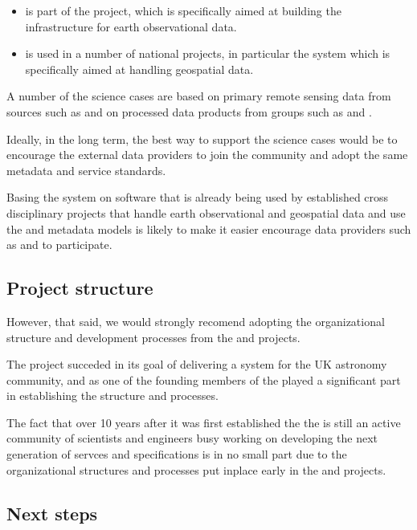 \documentclass{article}
\begin{document}
\begin{itemize}
    \item \cite{metacat} is part of the \cite{data-one} project, which is
    specifically aimed at building the infrastructure for earth observational
    data.
    \item \cite{ckan} is used in a number of national \cite{data-gov}
    projects, in particular the \cite{fgdc} \cite{fgdc-geo} system which
    is specifically aimed at handling geospatial data.
\end{itemize}

A number of the \cite{trop} science cases are based on primary remote
sensing data from sources such as \cite{landsat} and on processed data
products from groups such as \cite{nasa-jpl-carbon} and \cite{whrc}.

Ideally, in the long term, the best way to support the \cite{trop}
science cases would be to encourage the external data providers to join
the \cite{trop} community and adopt the same metadata and service standards.
 
Basing the \cite{trop} system on software that is already being used by
established cross disciplinary projects that handle earth observational
and geospatial data and use the \cite{gis} and \cite{eml} metadata
models is likely to make it easier encourage data providers such as
\cite{nasa-jpl-carbon} and \cite{whrc} to participate.

\subsection{Project structure}

However, that said, we would strongly recomend adopting the organizational
structure and development processes from the \cite{ivoa} and \cite{astro}
projects.


The \cite{astro} project succeded in its goal of delivering a \cite{vo}
system for the UK astronomy community, and as one of the founding members
of the \cite{ivoa} played a significant part in establishing the \cite{ivoa}
structure and processes.

The fact that over 10 years after it was first established the the \cite{ivoa}
is still an active community of scientists and engineers busy working on
developing the next generation of servces and specifications is in no small
part due to the organizational structures and processes put inplace early
in the \cite{astro} and \cite{ivoa} projects.


\subsection{Next steps}
\end{document}
